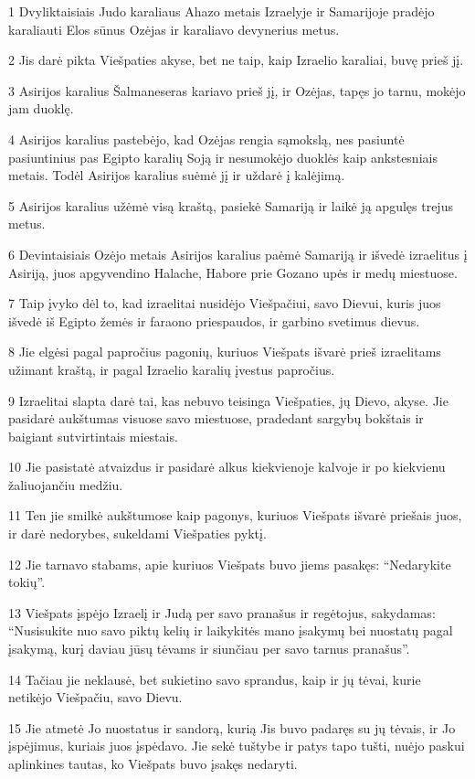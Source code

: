 \par 1 Dvyliktaisiais Judo karaliaus Ahazo metais Izraelyje ir Samarijoje pradėjo karaliauti Elos sūnus Ozėjas ir karaliavo devynerius metus. 
\par 2 Jis darė pikta Viešpaties akyse, bet ne taip, kaip Izraelio karaliai, buvę prieš jį. 
\par 3 Asirijos karalius Šalmaneseras kariavo prieš jį, ir Ozėjas, tapęs jo tarnu, mokėjo jam duoklę. 
\par 4 Asirijos karalius pastebėjo, kad Ozėjas rengia sąmokslą, nes pasiuntė pasiuntinius pas Egipto karalių Soją ir nesumokėjo duoklės kaip ankstesniais metais. Todėl Asirijos karalius suėmė jį ir uždarė į kalėjimą. 
\par 5 Asirijos karalius užėmė visą kraštą, pasiekė Samariją ir laikė ją apgulęs trejus metus. 
\par 6 Devintaisiais Ozėjo metais Asirijos karalius paėmė Samariją ir išvedė izraelitus į Asiriją, juos apgyvendino Halache, Habore prie Gozano upės ir medų miestuose. 
\par 7 Taip įvyko dėl to, kad izraelitai nusidėjo Viešpačiui, savo Dievui, kuris juos išvedė iš Egipto žemės ir faraono priespaudos, ir garbino svetimus dievus. 
\par 8 Jie elgėsi pagal papročius pagonių, kuriuos Viešpats išvarė prieš izraelitams užimant kraštą, ir pagal Izraelio karalių įvestus papročius. 
\par 9 Izraelitai slapta darė tai, kas nebuvo teisinga Viešpaties, jų Dievo, akyse. Jie pasidarė aukštumas visuose savo miestuose, pradedant sargybų bokštais ir baigiant sutvirtintais miestais. 
\par 10 Jie pasistatė atvaizdus ir pasidarė alkus kiekvienoje kalvoje ir po kiekvienu žaliuojančiu medžiu. 
\par 11 Ten jie smilkė aukštumose kaip pagonys, kuriuos Viešpats išvarė priešais juos, ir darė nedorybes, sukeldami Viešpaties pyktį. 
\par 12 Jie tarnavo stabams, apie kuriuos Viešpats buvo jiems pasakęs: “Nedarykite tokių”. 
\par 13 Viešpats įspėjo Izraelį ir Judą per savo pranašus ir regėtojus, sakydamas: “Nusisukite nuo savo piktų kelių ir laikykitės mano įsakymų bei nuostatų pagal įsakymą, kurį daviau jūsų tėvams ir siunčiau per savo tarnus pranašus”. 
\par 14 Tačiau jie neklausė, bet sukietino savo sprandus, kaip ir jų tėvai, kurie netikėjo Viešpačiu, savo Dievu. 
\par 15 Jie atmetė Jo nuostatus ir sandorą, kurią Jis buvo padaręs su jų tėvais, ir Jo įspėjimus, kuriais juos įspėdavo. Jie sekė tuštybe ir patys tapo tušti, nuėjo paskui aplinkines tautas, ko Viešpats buvo įsakęs nedaryti. 

